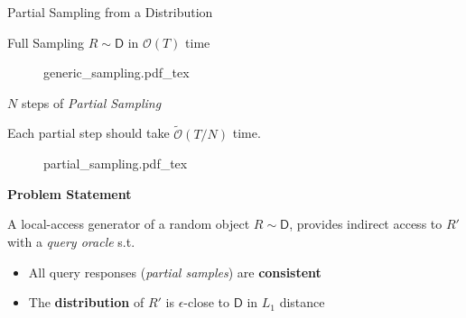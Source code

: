 \begin{block}{Partial Sampling from a Distribution}



\begin{alertblock}{Full Sampling $R \sim\mathsf D$ in $\mathcal O (T)$ time}

\begin{figure}[h!]\centering
    \def\svgwidth{0.5\columnwidth}
    {generic_sampling.pdf_tex}
\end{figure}

\end{alertblock}


\begin{alertblock}{$N$ steps of \emph{Partial Sampling}}

\begin{center}
Each partial step should take $\tilde{\mathcal O} (T/N)$ time.
\end{center}

\begin{figure}[h!]\centering
    \def\svgwidth{0.7\columnwidth}
    {partial_sampling.pdf_tex}
\end{figure}

\end{alertblock}


\begin{alertblock}{\textbf{Problem Statement}}

A local-access generator of a random object $R \sim\mathsf D$,
provides indirect access to $R'$ with a \emph{query oracle} s.t.
\begin{itemize}
    \item All query responses (\emph{partial samples}) are \textbf{consistent}
    \item The \textbf{distribution} of $R'$ is $\epsilon$-close to $\mathsf D$ in $L_1$ distance
\end{itemize}

\end{alertblock}



\end{block}

